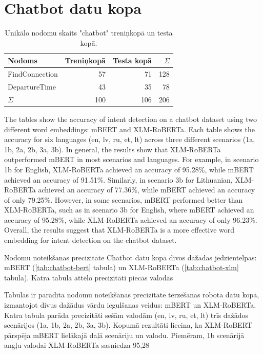 \section{Chatbot datu kopa}

\begin{table}[htbp]
  \centering
  \caption{Unikālo nodomu skaits "chatbot" treniņkopā un testa kopā.}
    \begin{tabular}{lrrr} \toprule
    Nodoms & Treniņkopā & Testa kopā & $\Sigma$ \\\midrule
    FindConnection & 57    & 71 & 128 \\
    DepartureTime & 43    & 35 & 78 \\
    $\Sigma$ & 100    & 106 & 206 \\\bottomrule
    \end{tabular}%
  \label{tab:chatbot-labels}%
\end{table}%



The tables show the accuracy of intent detection on a chatbot dataset using two different word embeddings: mBERT and XLM-RoBERTa. Each table shows the accuracy for six languages (en, lv, ru, et, lt) across three different scenarios (1a, 1b, 2a, 2b, 3a, 3b). In general, the results show that XLM-RoBERTa outperformed mBERT in most scenarios and languages. For example, in scenario 1b for English, XLM-RoBERTa achieved an accuracy of 95.28\%, while mBERT achieved an accuracy of 91.51\%. Similarly, in scenario 3b for Lithuanian, XLM-RoBERTa achieved an accuracy of 77.36\%, while mBERT achieved an accuracy of only 79.25\%. However, in some scenarios, mBERT performed better than XLM-RoBERTa, such as in scenario 3b for English, where mBERT achieved an accuracy of 95.28\%, while XLM-RoBERTa achieved an accuracy of only 96.23\%. Overall, the results suggest that XLM-RoBERTa is a more effective word embedding for intent detection on the chatbot dataset.



Nodomu noteikšanas precizitāte Chatbot datu kopā divos dažādas jēdzientelpas: mBERT (\ref{tab:chatbot-bert} tabula) un XLM-RoBERTa (\ref{tab:chatbot-xlm} tabula). Katra tabula attēlo precizitāti piecās valodās 



Tabulās ir parādīta nodomu noteikšanas precizitāte tērzēšanas robota datu kopā, izmantojot divus dažādus vārdu iegulšanas veidus: mBERT un XLM-RoBERTa. Katra tabula parāda precizitāti sešām valodām (en, lv, ru, et, lt) trīs dažādos scenārijos (1a, 1b, 2a, 2b, 3a, 3b). Kopumā rezultāti liecina, ka XLM-RoBERT pārspēja mBERT lielākajā daļā scenāriju un valodu. Piemēram, 1b scenārijā angļu valodai XLM-RoBERTa sasniedza 95,28%



